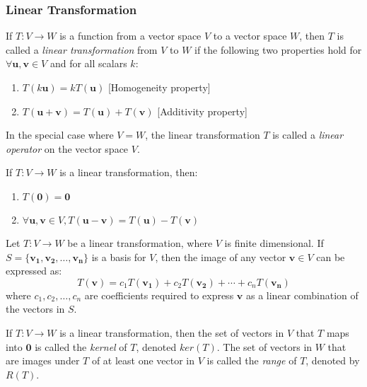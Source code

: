\documentclass{report}
\begin{document}
		\subsubsection{Linear Transformation}
		\begin{defn}
			If $T:V\rightarrow W$ is a function from a vector space $V$ to a vector space $W$, then $T$ is called a \emph{linear transformation} from $V$ to $W$ if the following two properties hold for $\forall \bm{u}, \bm{v} \in V$ and for all scalars $k$:
			\begin{enumerate}
				\item $T(k\bm{u})=kT(\bm{u})$ [Homogeneity property]
				\item $T(\bm{u}+\bm{v})=T(\bm{u})+T(\bm{v})$ [Additivity property]
			\end{enumerate}
			In the special case where $V=W$, the linear transformation $T$ is called a \emph{linear operator} on the vector space $V$.
		\end{defn}
		
		\begin{thm}
			If $T:V\rightarrow W$ is a linear transformation, then:
			\begin{enumerate}
				\item $T(\bm{0})=\bm{0}$
				\item $\forall \bm{u}, \bm{v} \in V, T(\bm{u}-\bm{v})=T(\bm{u})-T(\bm{v})$
			\end{enumerate}
		\end{thm}
		
		\begin{thm}
			Let $T:V \rightarrow W$ be a linear transformation, where $V$ is finite dimensional. If $S=\{\bm{v_1}, \bm{v_2}, \dots,\bm{v_n}\}$ is a basis for $V$, then the image of any vector $\bm{v} \in V$ can be expressed as:
			\begin{displaymath}
				T(\bm{v})=c_1T(\bm{v_1})+c_2T(\bm{v_2})+\cdots+c_nT(\bm{v_n})
			\end{displaymath}
			where $c_1,c_2,\dots,c_n$ are coefficients required to express $\bm{v}$ as a linear combination of the vectors in $S$.
		\end{thm}
		
		\begin{defn}
			If $T:V \rightarrow W$ is a linear transformation, then the set of vectors in $V$ that $T$ maps into $\bm{0}$ is called the \emph{kernel} of $T$, denoted $ker(T)$. The set of vectors in $W$ that are images under $T$ of at least one vector in $V$ is called the \emph{range} of $T$, denoted by $R(T)$.
		\end{defn}
		
\end{document}
